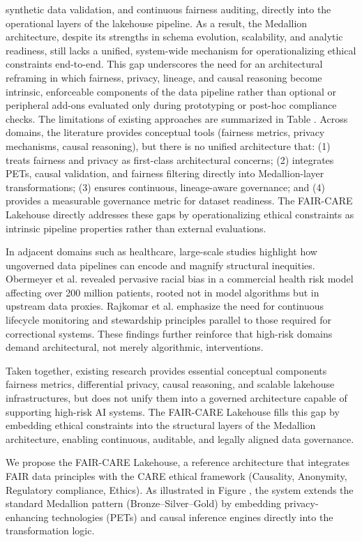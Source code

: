 synthetic data validation, and continuous fairness auditing, directly into the operational layers of the lakehouse pipeline. As a result, the Medallion architecture, despite its strengths in schema evolution, scalability, and analytic readiness, still lacks a unified, system-wide mechanism for operationalizing ethical constraints end-to-end. This gap underscores the need for an architectural reframing in which fairness, privacy, lineage, and causal reasoning become intrinsic, enforceable components of the data pipeline rather than optional or peripheral add-ons evaluated only during prototyping or post-hoc compliance checks.
The limitations of existing approaches are summarized in Table . Across domains, the literature provides conceptual tools (fairness metrics, privacy mechanisms, causal reasoning), but there is no unified architecture that:
(1) treats fairness and privacy as first-class architectural concerns;
(2) integrates PETs, causal validation, and fairness filtering directly into Medallion-layer transformations;
(3) ensures continuous, lineage-aware governance; and
(4) provides a measurable governance metric for dataset readiness.
The FAIR-CARE Lakehouse directly addresses these gaps by operationalizing ethical constraints as intrinsic pipeline properties rather than external evaluations.

In adjacent domains such as healthcare, large-scale studies highlight how ungoverned data pipelines can encode and magnify structural inequities. Obermeyer et al.  revealed pervasive racial bias in a commercial health risk model affecting over 200 million patients, rooted not in model algorithms but in upstream data proxies. Rajkomar et al.  emphasize the need for continuous lifecycle monitoring and stewardship principles parallel to those required for correctional systems. These findings further reinforce that high-risk domains demand architectural, not merely algorithmic, interventions.

Taken together, existing research provides essential conceptual components fairness metrics, differential privacy, causal reasoning, and scalable lakehouse infrastructures, but does not unify them into a governed architecture capable of supporting high-risk AI systems. The FAIR-CARE Lakehouse fills this gap by embedding ethical constraints into the structural layers of the Medallion architecture, enabling continuous, auditable, and legally aligned data governance.


We propose the FAIR-CARE Lakehouse, a reference architecture that integrates FAIR data principles with the CARE ethical framework (Causality, Anonymity, Regulatory compliance, Ethics). As illustrated in Figure , the system extends the standard Medallion pattern (Bronze--Silver--Gold)  by embedding privacy-enhancing technologies (PETs) and causal inference engines directly into the transformation logic.

